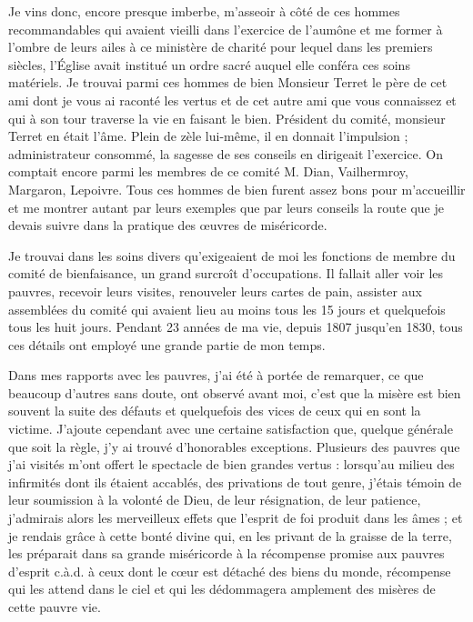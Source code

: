 \documentclass[11pt,a4paper]{report}
\begin{document}
Je vins donc, encore presque imberbe, m'asseoir à côté de ces hommes recommandables qui avaient vieilli dans l'exercice de l'aumône et me former à l'ombre de leurs ailes à ce ministère de charité pour lequel dans les premiers siècles, l'Église avait institué un ordre sacré auquel elle conféra ces soins matériels. Je trouvai parmi ces hommes de bien Monsieur Terret le père de cet ami dont je vous ai raconté les vertus et de cet autre ami que vous connaissez et qui à son tour traverse la vie en faisant le bien. Président du comité, monsieur Terret en était l'âme. Plein de zèle lui-même, il en donnait l'impulsion ; administrateur consommé, la sagesse de ses conseils en dirigeait l'exercice. On comptait encore parmi les membres de ce comité M. Dian, Vailhermroy, Margaron, Lepoivre. Tous ces hommes de bien furent assez bons pour m'accueillir et me montrer autant par leurs exemples que par leurs conseils la route que je devais suivre dans la pratique des œuvres de miséricorde.

Je trouvai dans les soins divers qu'exigeaient de moi les fonctions de membre du comité de bienfaisance, un grand surcroît d'occupations. Il fallait aller voir les pauvres, recevoir leurs visites, renouveler leurs cartes de pain, assister aux assemblées du comité qui avaient lieu au moins tous les 15 jours et quelquefois tous les huit jours. Pendant 23 années de ma vie, depuis 1807 jusqu'en 1830, tous ces détails ont employé une grande partie de mon temps.

Dans mes rapports avec les pauvres, j'ai été à portée de remarquer, ce que beaucoup d'autres sans doute, ont observé avant moi, c'est que la misère est bien souvent la suite des défauts et quelquefois des vices de ceux qui en sont la victime. J'ajoute cependant avec une certaine satisfaction que, quelque générale que soit la règle, j'y ai trouvé d'honorables exceptions. Plusieurs des pauvres que j'ai visités m'ont offert le spectacle de bien grandes vertus : lorsqu'au milieu des infirmités dont ils étaient accablés, des privations de tout genre, j'étais témoin de leur soumission à la volonté de Dieu, de leur résignation, de leur patience, j'admirais alors les merveilleux effets que l'esprit de foi produit dans les âmes ; et je rendais grâce à cette bonté divine qui, en les privant de la graisse de la terre, les préparait dans sa grande miséricorde à la récompense promise aux pauvres d'esprit c.à.d. à ceux dont le cœur est détaché des biens du monde, récompense qui les attend dans le ciel et qui les dédommagera amplement des misères de cette pauvre vie.
\end{document}
